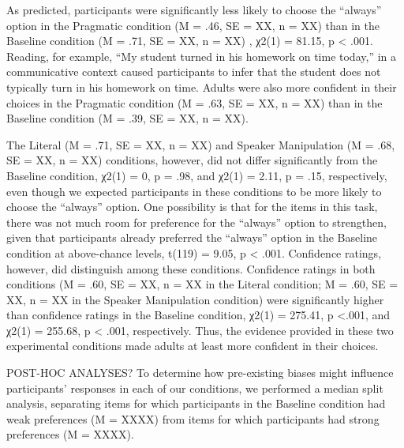 \documentclass[10pt,letterpaper]{article}
\begin{document}
As predicted, participants were significantly less likely to choose the “always” option in the Pragmatic condition (M = .46, SE = XX, n = XX) than in the Baseline condition (M = .71, SE = XX, n = XX) , χ2(1) = 81.15, p < .001.  Reading, for example, “My student turned in his homework on time today,” in a communicative context caused participants to infer that the student does not typically turn in his homework on time.  Adults were also more confident in their choices in the Pragmatic condition (M = .63, SE = XX, n = XX) than in the Baseline condition (M = .39, SE = XX, n = XX).

The Literal (M = .71, SE = XX, n = XX) and Speaker Manipulation (M = .68,  SE = XX, n = XX) conditions, however, did not differ significantly from the Baseline condition, χ2(1) = 0, p = .98, and χ2(1) = 2.11, p = .15, respectively, even though we expected participants in these conditions to be more likely to choose the “always” option.  One possibility is that for the items in this task, there was not much room for preference for the “always” option to strengthen, given that participants already preferred the “always” option in the Baseline condition at above-chance levels, t(119) = 9.05, p < .001.  Confidence ratings, however, did distinguish among these conditions.  Confidence ratings in both conditions (M = .60, SE = XX, n = XX in the Literal condition; M = .60, SE = XX, n = XX in the Speaker Manipulation condition) were significantly higher than confidence ratings in the Baseline condition,  χ2(1) = 275.41, p <.001, and χ2(1) = 255.68, p < .001, respectively.  Thus, the evidence provided in these two experimental conditions made adults at least more confident in their choices.  

POST-HOC ANALYSES?
To determine how pre-existing biases might influence participants’ responses in each of our conditions, we performed a median split analysis, separating items for which participants in the Baseline condition had weak preferences (M  = XXXX) from items for which participants had strong preferences (M = XXXX).  




\setlength{\bibleftmargin}{.125in}
\setlength{\bibindent}{-\bibleftmargin}


\end{document}
